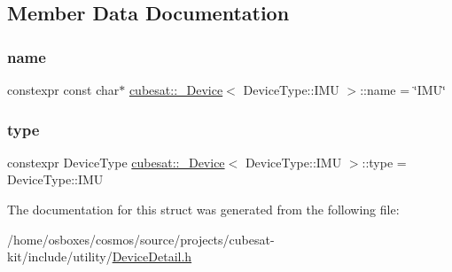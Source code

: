 \subsection{Member Data Documentation}
\mbox{\label{structcubesat_1_1__Device_3_01DeviceType_1_1IMU_01_4_ac1d1439bf7274a528c8944e344ae9d71}} 
\subsubsection{\texorpdfstring{name}{name}}
{\footnotesize\ttfamily constexpr const char$\ast$ \hyperlink{structcubesat_1_1__Device}{cubesat\+::\+\_\+\+Device}$<$ Device\+Type\+::\+I\+MU $>$\+::name = \char`\"{}I\+MU\char`\"{}\hspace{0.3cm}{\ttfamily [static]}}

\mbox{\label{structcubesat_1_1__Device_3_01DeviceType_1_1IMU_01_4_a9b40a9ab113eafbff0b4e53782b72603}} 
\subsubsection{\texorpdfstring{type}{type}}
{\footnotesize\ttfamily constexpr Device\+Type \hyperlink{structcubesat_1_1__Device}{cubesat\+::\+\_\+\+Device}$<$ Device\+Type\+::\+I\+MU $>$\+::type = Device\+Type\+::\+I\+MU\hspace{0.3cm}{\ttfamily [static]}}



The documentation for this struct was generated from the following file\+:\begin{DoxyCompactItemize}
\item 
/home/osboxes/cosmos/source/projects/cubesat-\/kit/include/utility/\hyperlink{DeviceDetail_8h}{Device\+Detail.\+h}\end{DoxyCompactItemize}
